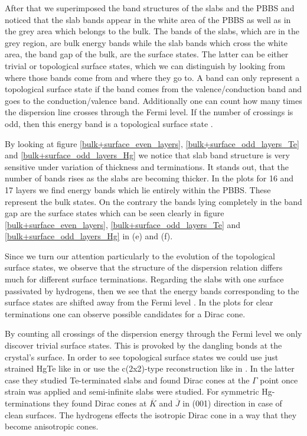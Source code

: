 	After that we superimposed the band structures of the slabs and the PBBS and noticed that the slab bands appear in the white area of the PBBS as well as in the grey area which belongs to the bulk. 
	The bands of the slabs, which are in the grey region, are bulk energy bands while the slab bands which cross the white area, the band gap of the bulk, are the surface states. The latter can be either trivial or topological surface states, which we can distinguish by looking from where those bands come from and where they go to. A band can only represent a topological surface state if the band comes from the valence/conduction band and goes to the conduction/valence band. 
	Additionally one can count how many times the dispersion line crosses through the Fermi level. If the number of crossings is odd, then this energy band is a topological surface state \cite{Bansil}.
	
	By looking at figure \ref{bulk+surface_even_layers}, \ref{bulk+surface_odd_layers_Te} and \ref{bulk+surface_odd_layers_Hg} we notice that slab band structure is very sensitive under variation of thickness and terminations. It stands out, that the number of bands rises as the slabs are becoming thicker. In the plots for 16 and 17 layers we find energy bands which lie entirely within the PBBS. These represent the bulk states. On the contrary the bands lying completely in the band gap are the surface states which can be seen clearly in figure \ref{bulk+surface_even_layers}, \ref{bulk+surface_odd_layers_Te} and \ref{bulk+surface_odd_layers_Hg} in (e) and (f). 
	
	Since we turn our attention particularly to the evolution of the topological surface states, we observe that the structure of the dispersion relation differs much for different surface terminations. 
	Regarding the slabs with one surface passivated by hydrogens, then we see that the energy bands corresponding to the surface states are shifted away from the Fermi level \cite{top_surf_states}. In the plots for clear terminations one can observe possible candidates for a Dirac cone.
	
	By counting all crossings of the dispersion energy through the Fermi level we only discover trivial surface states. This is provoked by the dangling bonds at the crystal's surface. 
	In order to see topological surface states we could use just strained HgTe like in \cite{HgTe_structure_001} or use the c(2x2)-type reconstruction like in \cite{top_surf_states}. In the latter case they studied Te-terminated slabs and found Dirac cones at the $\Gamma$ point once strain was applied and semi-infinite slabs were studied. For symmetric Hg-terminations they found Dirac cones at $\overline{K}$ and $\overline{J}$ in (001) direction in case of clean surfaces. 
	The hydrogens effects the isotropic Dirac cone in a way that they become anisotropic cones.  
	
